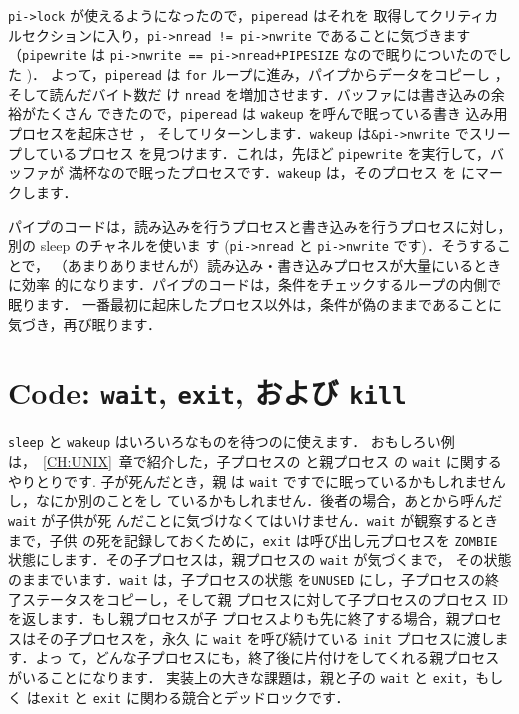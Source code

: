 \lstinline{pi->lock} が使えるようになったので，\lstinline{piperead} はそれを
取得してクリティカルセクションに入り，\lstinline{pi->nread != pi->nwrite}
であることに気づきます
（\lstinline{pipewrite} は \lstinline{pi->nwrite == pi->nread+PIPESIZE} 
なので眠りについたのでした
)．
よって，\lstinline{piperead} は \lstinline{for} ループに進み，パイプからデータをコピーし
，
そして読んだバイト数だ
け \lstinline{nread} を増加させます．バッファには書き込みの余裕がたくさん
できたので，\lstinline{piperead} は \lstinline{wakeup} を呼んで眠っている書き
込み用プロセスを起床させ
，
そしてリターンします．\lstinline{wakeup} は\lstinline{&pi->nwrite} でスリープしているプロセス
を見つけます．これは，先ほど \lstinline{pipewrite} を実行して，バッファが
満杯なので眠ったプロセスです．\lstinline{wakeup} は，そのプロセス
を  にマークします．

パイプのコードは，読み込みを行うプロセスと書き込みを行うプロセスに対し，
別の sleep のチャネルを使いま
す (\lstinline{pi->nread} と \lstinline{pi->nwrite} です)．そうすることで，
（あまりありませんが）読み込み・書き込みプロセスが大量にいるときに効率
的になります．パイプのコードは，条件をチェックするループの内側で眠ります．
一番最初に起床したプロセス以外は，条件が偽のままであることに気づき，再び眠ります．

\section{Code: \texttt{wait}, \texttt{exit}, および \texttt{kill}}
\lstinline{sleep} と \lstinline{wakeup} はいろいろなものを待つのに使えます．
おもしろい例は，~\ref{CH:UNIX}~章で紹介した，子プロセスの  と親プロセス
の \lstinline{wait} に関するやりとりです. 子が死んだとき，親
は \lstinline{wait} ですでに眠っているかもしれませんし，なにか別のことをし
ているかもしれません．後者の場合，あとから呼んだ \lstinline{wait} が子供が死
んだことに気づけなくてはいけません．\lstinline{wait} が観察するときまで，子供
の死を記録しておくために，\lstinline{exit} は呼び出し元プロセスを \lstinline{ZOMBIE}
状態にします．その子プロセスは，親プロセスの \lstinline{wait} が気づくまで，
その状態のままでいます．\lstinline{wait} は，子プロセスの状態
を\lstinline{UNUSED} にし，子プロセスの終了ステータスをコピーし，そして親
プロセスに対して子プロセスのプロセス ID を返します．もし親プロセスが子
プロセスよりも先に終了する場合，親プロセスはその子プロセスを，永久
に \lstinline{wait} を呼び続けている \lstinline{init} プロセスに渡します．よっ
て，どんな子プロセスにも，終了後に片付けをしてくれる親プロセスがいることになります．
実装上の大きな課題は，親と子の \lstinline{wait} と \lstinline{exit}，もしく
は\lstinline{exit} と \lstinline{exit} に関わる競合とデッドロックです．

